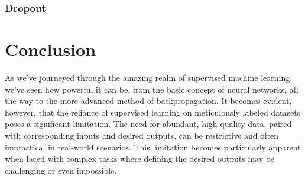 \documentclass{article}
\begin{document}
\subsubsection{Dropout}%
  \label{sub:Dropout}
    \section{Conclusion}%
    \label{sec:Conclusion}
  As we've journeyed through the amazing realm of supervised machine learning, we've seen how powerful it can be, from the basic concept of neural networks, all the way to the more advanced method of backpropagation. It becomes evident, however, that the reliance of supervised learning on meticulously labeled datasets poses a significant limitation. The need for abundant, high-quality data, paired with corresponding inputs and desired outputs, can be restrictive and often impractical in real-world scenarios. This limitation becomes particularly apparent when faced with complex tasks where defining the desired outputs may be challenging or even impossible.

\newpage

 

 

{\footnotesize
  
}
% 



%
%
%
\end{document}
